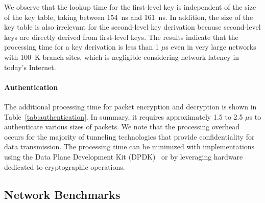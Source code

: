 We observe that the lookup time for the first-level key is independent of the size of the key 
table, taking between \SI{154}{ns} and \SI{161}{ns}. In addition, the size of the key table is 
also irrelevant for the second-level key derivation 
because second-level keys are directly derived from first-level keys.
The results indicate that the processing time for a key derivation is less than 1 $\mu$s 
even in very large networks with \SI{100}{K} branch sites, which is negligible considering
network latency in today's Internet.


\paragraph{Authentication}
The additional processing time for packet encryption and decryption is shown in 
Table~\ref{tab:authentication}. In summary, it requires approximately 1.5 to 2.5 $\mu$s to
authenticate various sizes of packets. We note that the processing overhead occurs for the majority
of tunneling technologies that provide confidentiality for data transmission. The processing 
time can be minimized with implementations using the Data Plane Development Kit (DPDK)~\cite{dpdk} or by leveraging hardware dedicated to cryptographic operations.



\subsection{Network Benchmarks}
\label{ssec:networkbenchmark}

